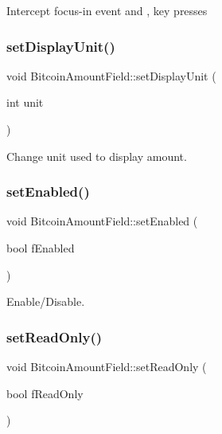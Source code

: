 Intercept focus-\/in event and \textquotesingle{},\textquotesingle{} key presses \mbox{\label{class_bitcoin_amount_field_a623534b2ad508278c5fa8f4c7f363804}} 
\subsubsection{\texorpdfstring{setDisplayUnit()}{setDisplayUnit()}}
{\footnotesize\ttfamily void Bitcoin\+Amount\+Field\+::set\+Display\+Unit (\begin{DoxyParamCaption}\item[{int}]{unit }\end{DoxyParamCaption})}

Change unit used to display amount. \mbox{\label{class_bitcoin_amount_field_a0f1bab2b81d298bdc7a3a8c612dbceaa}} 
\subsubsection{\texorpdfstring{setEnabled()}{setEnabled()}}
{\footnotesize\ttfamily void Bitcoin\+Amount\+Field\+::set\+Enabled (\begin{DoxyParamCaption}\item[{bool}]{f\+Enabled }\end{DoxyParamCaption})}

Enable/\+Disable. \mbox{\label{class_bitcoin_amount_field_a3762c335f161796bb2ea3208d9ec2efd}} 
\subsubsection{\texorpdfstring{setReadOnly()}{setReadOnly()}}
{\footnotesize\ttfamily void Bitcoin\+Amount\+Field\+::set\+Read\+Only (\begin{DoxyParamCaption}\item[{bool}]{f\+Read\+Only }\end{DoxyParamCaption})}

